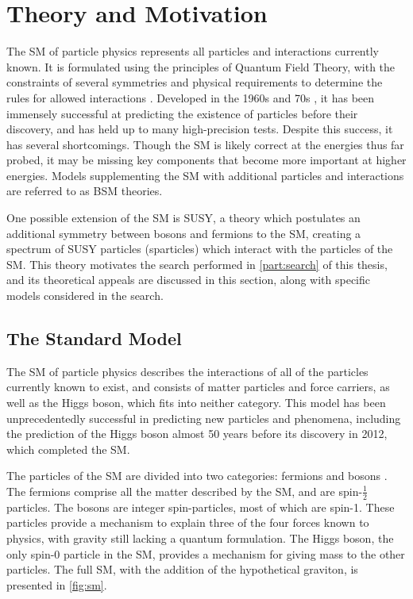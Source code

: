 
\chapter{Theory and Motivation} %

\label{ch:theory} %
The \acf{SM} of particle physics represents all particles and interactions currently known. It is formulated using the principles of Quantum Field Theory, with the constraints of several symmetries and physical requirements to determine the rules for allowed interactions \cite{Burgess:2007zi}. Developed in the 1960s and 70s \cite{Glashow:1961tr, PhysRev.127.331, PhysRevLett.19.1264}, it has been immensely successful at predicting the existence of particles before their discovery, and has held up to many high-precision tests. Despite this success, it has several shortcomings. Though the \ac{SM} is likely correct at the energies thus far probed, it may be missing key components that become more important at higher energies. Models supplementing the \ac{SM} with additional particles and interactions are referred to as \ac{BSM} theories. 

One possible extension of the \ac{SM} is \ac{SUSY}, a theory which postulates an additional symmetry between bosons and fermions to the \ac{SM}, creating a spectrum of \ac{SUSY} particles (sparticles) which interact with the particles of the \ac{SM}. This theory motivates the search performed in \autoref{part:search} of this thesis, and its theoretical appeals are discussed in this section, along with specific models considered in the search. 


\section{The Standard Model}
\label{sec:standard_model}
The \ac{SM} of particle physics describes the interactions of all of the particles currently known to exist, and consists of matter particles and force carriers, as well as the Higgs boson, which fits into neither category. This model has been unprecedentedly successful in predicting new particles and phenomena, including the prediction of the Higgs boson almost 50 years before its discovery in 2012, which completed the \ac{SM}.  

The particles of the \ac{SM} are divided into two categories: fermions and bosons \cite{Burgess:2007zi}. The fermions comprise all the matter described by the \ac{SM}, and are spin-$\frac{1}{2}$ particles. The bosons are integer spin-particles, most of which are spin-1. These particles provide a mechanism to explain three of the four forces known to physics, with gravity still lacking a quantum formulation. The Higgs boson, the only spin-0 particle in the \ac{SM}, provides a mechanism for giving mass to the other particles. The full \ac{SM}, with the addition of the hypothetical graviton, is presented in \autoref{fig:sm}. 

